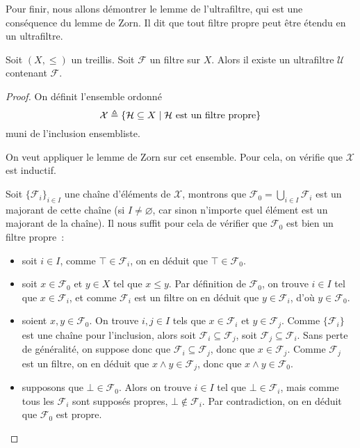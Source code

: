 Pour finir, nous allons démontrer le lemme de l'ultrafiltre, qui est une
conséquence du lemme de Zorn. Il dit que tout filtre propre peut être étendu en
un ultrafiltre.

\begin{theorem}\label{thm.ultrafilter.lemma}
  Soit $(X,\leq)$ un treillis. Soit $\mathcal F$ un filtre sur $X$. Alors il
  existe un ultrafiltre $\mathcal U$ contenant $\mathcal F$.
\end{theorem}

\begin{proof}
  On définit l'ensemble ordonné
  \[\mathcal X \triangleq \{\mathcal H \subseteq X\mid \mathcal H
  \text{ est un filtre propre}\}\]
  muni de l'inclusion ensembliste.

  On veut appliquer le lemme de Zorn sur cet ensemble. Pour cela, on vérifie
  que $\mathcal X$ est inductif.

  Soit $\{\mathcal F_i\}_{i\in I}$ une chaîne d'éléments de $\mathcal X$,
  montrons que $\mathcal F_0 = \displaystyle\bigcup_{i\in I} \mathcal F_i$ est un
  majorant de cette chaîne (si $I \neq \varnothing$, car sinon n'importe quel
  élément est un majorant de la chaîne). Il nous suffit pour cela de vérifier
  que $\mathcal F_0$ est bien un filtre propre~:
  \begin{itemize}
  \item soit $i\in I$, comme $\top \in \mathcal F_i$, on en déduit que
    $\top \in \mathcal F_0$.
  \item soit $x\in \mathcal F_0$ et $y\in X$ tel que $x\leq y$. Par définition
    de $\mathcal F_0$, on trouve $i\in I$ tel que $x\in \mathcal F_i$, et comme
    $\mathcal F_i$ est un filtre on en déduit que $y\in \mathcal F_i$, d'où
    $y\in\mathcal F_0$.
  \item soient $x,y\in \mathcal F_0$. On trouve $i,j\in I$ tels que
    $x\in \mathcal F_i$ et $y\in \mathcal F_j$. Comme $\{\mathcal F_i\}$ est une
    chaîne pour l'inclusion, alors soit $\mathcal F_i \subseteq \mathcal F_j$,
    soit $\mathcal F_j\subseteq \mathcal F_i$. Sans perte de généralité, on
    suppose donc que $\mathcal F_i\subseteq \mathcal F_j$, donc que
    $x\in \mathcal F_j$. Comme $\mathcal F_j$ est un filtre, on en déduit que
    $x\land y \in \mathcal F_j$, donc que $x\land y \in \mathcal F_0$.
  \item supposons que $\bot\in \mathcal F_0$. Alors on trouve $i\in I$ tel que
    $\bot\in \mathcal F_i$, mais comme tous les $\mathcal F_i$ sont supposés
    propres, $\bot\notin\mathcal F_i$. Par contradiction, on en déduit que
    $\mathcal F_0$ est propre.
  \end{itemize}


\end{proof}
